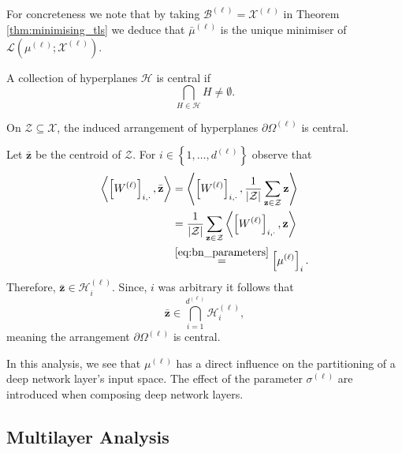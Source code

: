 \begin{remark}
    For concreteness we note that by taking $\mathcal{B}^{(\ell)}=\mathcal{X}^{(\ell)}$ in Theorem \ref{thm:minimising_tls} we deduce that $\bar{\mu}^{(\ell)}$ is the unique minimiser of $\mathcal{L}\left(\mu^{(\ell)};\mathcal{X}^{(\ell)}\right)$.
\end{remark}

\begin{definition}
    A collection of hyperplanes $\mathcal{H}$ is central if $$\bigcap_{H\in\mathcal{H}}H\neq\emptyset.$$
\end{definition}

\begin{corollary}
    On $\mathcal{Z}\subseteq\mathcal{X}$, the induced arrangement of hyperplanes $\partial\Omega^{(\ell)}$ is central.
\end{corollary}

\begin{tproof}
    Let $\bar{\mathbf{z}}$ be the centroid of $\mathcal{Z}$. For $i\in\left\{1,\dots,d^{(\ell)}\right\}$ observe that
    \begin{align*}
        \left\langle\left[W^{(\ell)}\right]_{i,\cdot},\bar{\mathbf{z}}\right\rangle&=\left\langle\left[W^{(\ell)}\right]_{i,\cdot},\frac{1}{\vert\mathcal{Z}\vert}\sum_{\mathbf{z}\in\mathcal{Z}}\mathbf{z}\right\rangle\\&=\frac{1}{\vert\mathcal{Z}\vert}\sum_{\mathbf{z}\in\mathcal{Z}}\left\langle\left[W^{(\ell)}\right]_{i,\cdot},\mathbf{z}\right\rangle\\&\overset{\eqref{eq:bn_parameters}}{=}\left[\mu^{(\ell)}\right]_i.
    \end{align*}
    Therefore, $\bar{\mathbf{z}}\in\mathcal{H}^{(\ell)}_i$. Since, $i$ was arbitrary it follows that $$\bar{\mathbf{z}}\in\bigcap_{i=1}^{d^{(\ell)}}\mathcal{H}^{(\ell)}_i,$$meaning the arrangement $\partial\Omega^{(\ell)}$ is central.
\end{tproof}

In this analysis, we see that $\mu^{(\ell)}$ has a direct influence on the partitioning of a deep network layer's input space. The effect of the parameter $\sigma^{(\ell)}$ are introduced when composing deep network layers.

\subsection{Multilayer Analysis}

